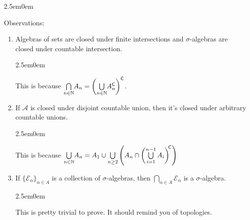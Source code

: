\documentclass{book}
\newcommand{\hTwo}{%
\color{MidnightBlue}%
   \fontsize{13}{15}\selectfont%
}
\newcommand{\hThree}{%
   \color{PineGreen!85!Orange}
   \fontsize{12}{14}\selectfont%
}
\newcommand{\exOne}{%
   \color{Purple}%
   \fontsize{13}{15}\selectfont%
}
\newenvironment{myIndent}{%
   \begin{adjustwidth}{2.5em}{0em}%
}{%
   \end{adjustwidth}%
}
\newcommand{\comp}{\mathsf{C}}
\newcommand{\retTwo}{\hfill\bigbreak}
\begin{document}
\begin{myIndent}\hTwo
   Observations:
   \begin{enumerate}
      \item Algebras of sets are closed under finite intersections and $\sigma$-algebras are\\ closed under countable intersection.
      
      \begin{myIndent}\hThree
         This is because $\bigcap\limits_{n \in \mathbb{N}}\hspace{-0.2em}A_n = \left(\bigcup\limits_{n \in \mathbb{N}}\hspace{-0.2em}A_n^\comp\right)^\comp$\hspace{-0.4em}.
      \end{myIndent}

      \item If $\mathcal{A}$ is closed under disjoint countable union, then it's closed under arbitrary countable unions.
      
      \begin{myIndent}\hThree
         This is because $\bigcup\limits_{n \in \mathbb{N}}\hspace{-0.2em}A_n = A_1 \cup \bigcup\limits_{n \geq 2}\left(A_n \cap \left(\bigcup\limits_{i = 1}^{n-1} A_i\right)^{\hspace{-0.2em}\comp}\right)$
      \end{myIndent}

      \item If $\{\mathcal{E}_\alpha\}_{\alpha \in A}$ is a collection of $\sigma$-algebras, then $\bigcap\limits_{\alpha \in A}\mathcal{E}_\alpha$ is a $\sigma$-algebra.
      
      \begin{myIndent}\hThree
         This is pretty trivial to prove. It should remind you of topologies.\retTwo 
      \end{myIndent}
   \end{enumerate}
\end{myIndent}

\exOne
\end{document}
